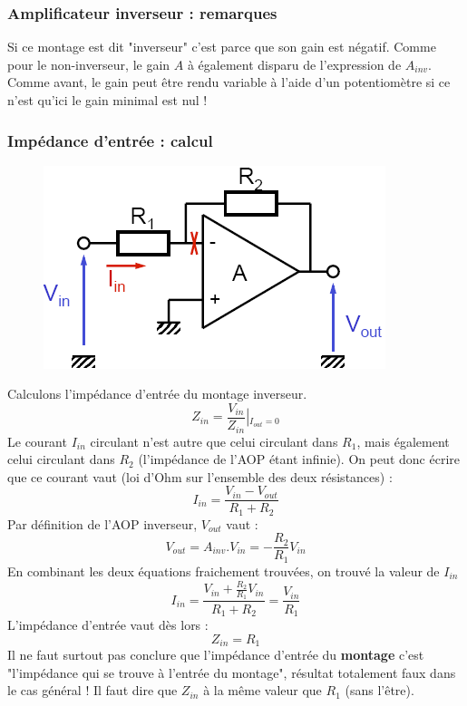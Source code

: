 \documentclass	[11pt, a4paper, openany]{book}
\begin{document}
\subsubsection{Amplificateur inverseur : remarques}
Si ce montage est dit "inverseur" c'est parce que son gain est négatif. Comme pour le non-inverseur, le gain $A$ à également disparu de l'expression de $A_{inv}$. Comme avant, le gain peut être rendu variable à l'aide d'un potentiomètre si ce n'est qu'ici le gain minimal est nul !

\newpage
\subsubsection{Impédance d'entrée : calcul}
\begin{figure}
\includegraphics[scale=0.35]{img/image48}
\end{figure}
Calculons l'impédance d'entrée du montage inverseur. 
\begin{equation}
Z_{in} = \frac{V_{in}}{Z_{in}}\left|_{I_{out} = 0}\right.
\end{equation}
Le courant $I_{in}$ circulant n'est autre que celui circulant dans $R_1$, mais également celui circulant dans $R_2$ (l'impédance de l'AOP étant infinie). On peut donc écrire que ce courant vaut (loi d'Ohm sur l'ensemble des deux résistances) :
\begin{equation}
I_{in} = \frac{V_{in} - V_{out}}{R_1+R_2}
\end{equation}
Par définition de l'AOP inverseur, $V_{out}$ vaut :
\begin{equation}
V_{out} = A_{inv}.V_{in} = -\frac{R_2}{R_1}V_{in}
\end{equation}
En combinant les deux équations fraichement trouvées, on trouvé la valeur de $I_{in}$
\begin{equation}
I_{in} = \frac{V_{in} + \frac{R_2}{R_1}V_{in}}{R_1+R_2} = \frac{V_{in}}{R_1}
\end{equation}
L'impédance d'entrée vaut dès lors :
\begin{equation}
Z_{in} = R_1
\end{equation}
Il ne faut surtout pas conclure que l'impédance d'entrée du \textbf{montage} c'est "l'impédance qui se trouve à l'entrée du montage", résultat totalement faux dans le cas général ! Il faut dire que $Z_{in}$ à la même valeur que $R_1$ (sans l'être).\\
\end{document}
